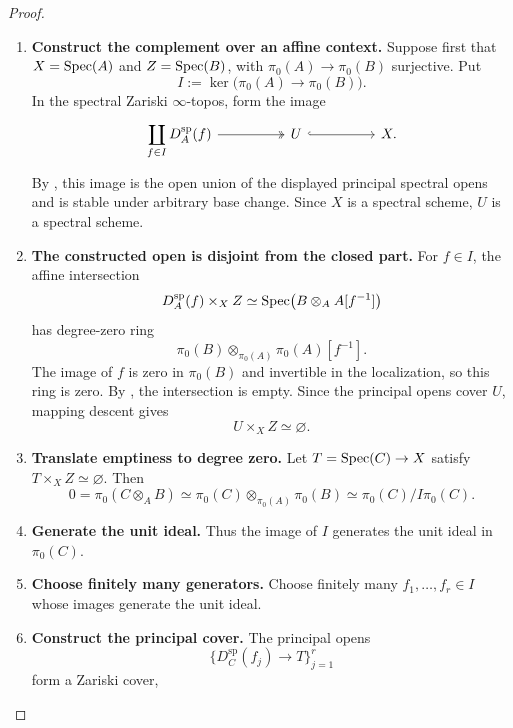 \begin{proof}
\leavevmode
\begin{enumerate}[label=\textup{(\arabic*)}]
    \item \textbf{Construct the complement over an affine context.}
    Suppose first that \(X=\operatorname{Spec}(A)\) and
    \(Z=\operatorname{Spec}(B)\), with \(\pi_0(A)\to\pi_0(B)\) surjective. Put
    \[
        I:=\ker\bigl(\pi_0(A)\to\pi_0(B)\bigr).
    \]
    In the spectral Zariski \(\infty\)-topos, form the image
    \[
    \begin{tikzcd}[column sep=huge]
        \displaystyle\coprod_{f\in I}D_A^{\mathrm{sp}}(f)
            \arrow[r, two heads]
        &
        U
            \arrow[r, hook]
        &
        X.
    \end{tikzcd}
    \]
    By , this image is the open union of the
    displayed principal spectral opens and is stable under arbitrary base
    change. Since \(X\) is a spectral scheme, \(U\) is a spectral scheme.

    \item \textbf{The constructed open is disjoint from the closed part.}
    For \(f\in I\), the affine intersection
    \[
        D_A^{\mathrm{sp}}(f)\times_XZ
        \simeq
        \operatorname{Spec}\bigl(B\otimes_AA[f^{-1}]\bigr)
    \]
    has degree-zero ring
    \[
        \pi_0(B)\otimes_{\pi_0(A)}\pi_0(A)[f^{-1}].
    \]
    The image of \(f\) is zero in \(\pi_0(B)\) and invertible in the
    localization, so this ring is zero. By
    , the intersection is
    empty. Since the principal opens cover \(U\), mapping descent gives
    \[
        U\times_XZ\simeq\varnothing.
    \]

    \item \textbf{Translate emptiness to degree zero.}
    Let \(T=\operatorname{Spec}(C)\to X\) satisfy
    \(T\times_XZ\simeq\varnothing\). Then
    \[
        0
        =
        \pi_0(C\otimes_AB)
        \simeq
        \pi_0(C)\otimes_{\pi_0(A)}\pi_0(B)
        \simeq
        \pi_0(C)/I\pi_0(C).
    \]

    \item \textbf{Generate the unit ideal.}
    Thus the image of \(I\) generates the unit ideal in \(\pi_0(C)\).

    \item \textbf{Choose finitely many generators.}
    Choose finitely many \(f_1,\ldots,f_r\in I\) whose images generate the
    unit ideal.

    \item \textbf{Construct the principal cover.}
    The principal opens
    \[
        \{D_C^{\mathrm{sp}}(f_j)\to T\}_{j=1}^r
    \]
    form a Zariski cover,


\end{enumerate}
\end{proof}
